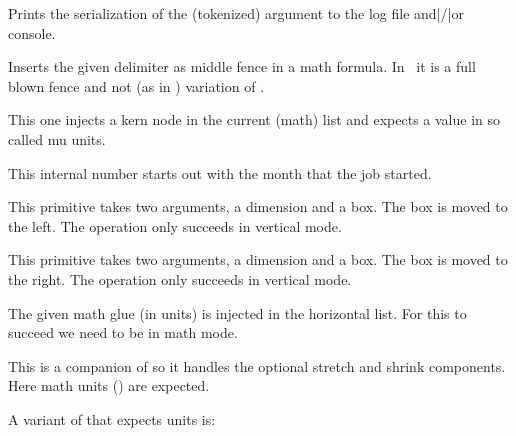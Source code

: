 \stopoldprimitive

\startoldprimitive[title={\prm {message}}]

Prints the serialization of the (tokenized) argument to the log file and|/|or
console.

\stopoldprimitive

\startoldprimitive[title={\prm {middle}}]

Inserts the given delimiter as middle fence in a math formula. In \LUAMETATEX\ it
is a full blown fence and not (as in \ETEX) variation of .

\stopoldprimitive

\startoldprimitive[title={\prm {mkern}}]

This one injects a kern node in the current (math) list and expects a value in so
called mu units.

\stopoldprimitive

\startoldprimitive[title={\prm {month}}]

This internal number starts out with the month that the job started.

\stopoldprimitive

\startoldprimitive[title={\prm {moveleft}}]

This primitive takes two arguments, a dimension and a box. The box is moved to
the left. The operation only succeeds in vertical mode.

\stopoldprimitive

\startoldprimitive[title={\prm {moveright}}]

This primitive takes two arguments, a dimension and a box. The box is moved to
the right. The operation only succeeds in vertical mode.

\stopoldprimitive

\startoldprimitive[title={\prm {mskip}}]

The given math glue (in  units) is injected in the horizontal list. For
this to succeed we need to be in math mode.

\stopoldprimitive

\startoldprimitive[title={\prm {muexpr}}]

This is a companion of  so it handles the optional stretch and
shrink components. Here math units () are expected.

\stopoldprimitive

\startnewprimitive[title={\prm {mugluespecdef}}]

A variant of  that expects  units is:

